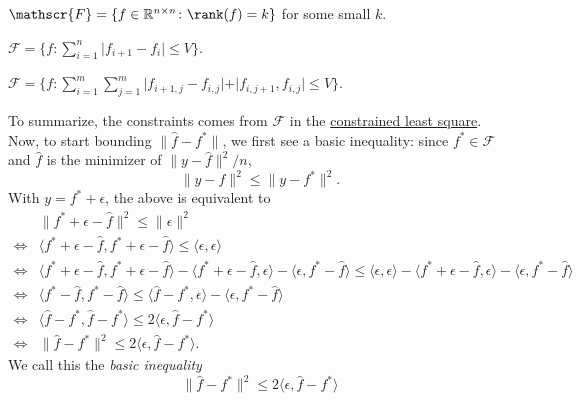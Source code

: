 \begin{eg}
	\(\mathscr{F} = \{f \in \mathbb{R} ^{n \times n} \colon \rank (f) = k \} \) for some small \(k\).
\end{eg}

\begin{eg}
	\(\mathscr{F} = \{f \colon \sum_{i = 1}^n \vert f_{i+1} - f_i \vert \leq V \} \).
\end{eg}

\begin{eg}
	\(\mathscr{F} = \{f \colon \sum_{i=1}^{m} \sum_{j=1}^{m} \vert f_{i+1, j} - f_{i, j} \vert + \vert f_{i, j+1} , f_{i, j} \vert \leq V \} \).
\end{eg}

To summarize, the constraints comes from \(\mathscr{F} \) in the \hyperref[prb:constrained-least-square]{constrained least square}. Now, to start bounding \(\lVert \hat{f} - f^{\ast} \rVert \), we first see a basic inequality: since \(f^{\ast} \in \mathscr{F} \) and \(\hat{f} \) is the minimizer of \(\lVert y - \hat{f} \rVert ^2 / n \),
\[
	\lVert y - \hat{f} \rVert ^2 \leq \lVert y - f^{\ast}  \rVert ^2.
\]
With \(y = f^{\ast} + \epsilon \), the above is equivalent to
\[
	\begin{split}
		&\lVert f^{\ast} + \epsilon - \hat{f}  \rVert ^2 \leq \lVert \epsilon \rVert ^2 \\
		\iff &\langle f^{\ast} + \epsilon - \hat{f} , f^{\ast} + \epsilon - \hat{f} \rangle \leq \langle \epsilon , \epsilon \rangle \\
		\iff &\langle f^{\ast} + \epsilon - \hat{f} , f^{\ast} + \epsilon - \hat{f} \rangle - \langle f^{\ast} + \epsilon - \hat{f}, \epsilon \rangle - \langle \epsilon , f^{\ast} - \hat{f} \rangle \leq \langle \epsilon , \epsilon \rangle - \langle f^{\ast} + \epsilon - \hat{f}, \epsilon \rangle - \langle \epsilon , f^{\ast} - \hat{f} \rangle \\
		\iff &\langle f^{\ast} - \hat{f} , f^{\ast} - \hat{f} \rangle \leq \langle \hat{f} - f^{\ast} , \epsilon \rangle - \langle \epsilon , f^{\ast} - \hat{f} \rangle \\
		\iff &\langle \hat{f} - f^{\ast} , \hat{f} - f^{\ast} \rangle \leq 2 \langle \epsilon , \hat{f} - f^{\ast} \rangle \\
		\iff &\lVert \hat{f} - f^{\ast}  \rVert ^2 \leq 2 \langle \epsilon , \hat{f} - f^{\ast}  \rangle .
	\end{split}
\]
We call this the \emph{basic inequality}
\begin{equation}\label{eq:basic-inequality}
	\lVert \hat{f} - f^{\ast}  \rVert ^2 \leq 2 \langle \epsilon , \hat{f} - f^{\ast}  \rangle
\end{equation}


